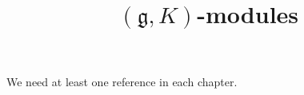 


%


\title{$(\mathfrak g, K)$-modules}


\maketitle

\label{section-phantom}

\tableofcontents


We need at least one reference \cite{reference} in each chapter.














